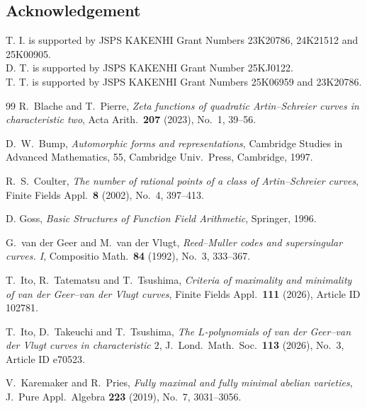 \documentclass[12pt,a4paper]{amsart}
\theoremstyle{definition}
\theoremstyle{remark}
\begin{document}
\subsection*{Acknowledgement} 
T. I. is supported by JSPS KAKENHI Grant Numbers 23K20786, 24K21512 and 25K00905.\\
D. T. is supported by JSPS KAKENHI Grant Number 25KJ0122.\\
T. T. is supported by JSPS KAKENHI Grant Numbers 25K06959 and 23K20786.

\begin{thebibliography}{99}
R.~Blache and T.~Pierre,
\textit{Zeta functions of quadratic Artin--Schreier curves in characteristic two},
Acta Arith.\ \textbf{207} (2023), No.~1, 39--56.

D.~W.\ Bump, 
\textit{Automorphic forms and representations}, 
Cambridge Studies in Advanced Mathematics, 55, Cambridge Univ.\ Press, Cambridge, 1997.

R.\ S.\ Coulter,
\textit{The number of rational points of a class of Artin--Schreier curves},
Finite Fields Appl.\ \textbf{8} (2002), No.~4, 397--413.


D. Goss,
\textit{Basic Structures of Function Field Arithmetic},
Springer, 1996.

G.\ van der Geer and M.\ van der Vlugt,
\textit{Reed--Muller codes and supersingular curves. I},
Compositio Math.\ \textbf{84} (1992), No.~3, 333--367.


T.\ Ito, R.\ Tatematsu and T.\ Tsushima,
\textit{Criteria of maximality and minimality of van der Geer--van der Vlugt curves},
Finite Fields Appl.\ \textbf{111} (2026), Article ID 102781.

T.\ Ito, D.\ Takeuchi and T.\ Tsushima,
\textit{The $L$-polynomials of van der Geer--van der Vlugt curves in characteristic $2$},
J.\ Lond.\ Math.\ Soc.\ \textbf{113} (2026), No.~3, Article ID e70523.

V.\ Karemaker and R.\ Pries, 
\textit{Fully maximal and fully minimal abelian varieties}, 
J.\ Pure Appl.\ Algebra \textbf{223} (2019), No.~7, 3031--3056.


\end{thebibliography}
\end{document}
